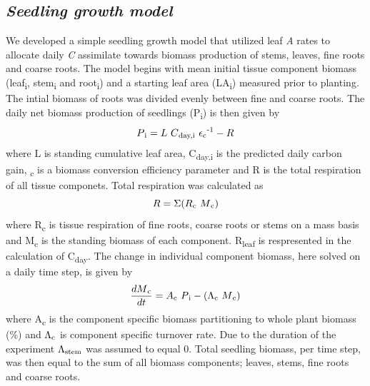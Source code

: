 \documentclass[a4paper]{article}\usepackage[]{graphicx}\usepackage[]{color}
\begin{document}
\subsection*{\textit{Seedling growth model}}
We developed a simple seedling growth model that utilized leaf \textit{A} rates to allocate daily \textit{C} assimilate towards biomass production of stems, leaves, fine roots and coarse roots. The model begins with mean initial tissue component biomass (leaf\textsubscript{i}, stem\textsubscript{i} and root\textsubscript{i}) and a starting leaf area (LA\textsubscript{i}) measured prior to planting. The intial biomass of roots was divided evenly between fine and coarse roots. The daily net biomass production of seedlings (P\textsubscript{i}) is then given by
\begin{equation} P\textsubscript{i}=L~C\textsubscript{day,i}~\epsilon\textsubscript{c}\textsuperscript{-1}-R
\label{eq:prod}
\end{equation}
where L is standing cumulative leaf area, C\textsubscript{day,i} is the predicted daily carbon gain, \textepsilon\textsubscript{c} is a biomass conversion efficiency parameter and R is the total respiration of all tissue componets. Total respiration was calculated as 
\begin{equation} R=\Sigma(R\textsubscript{c}~M\textsubscript{c})
\label{eq:resp}
\end{equation}
where R\textsubscript{c} is tissue respiration of fine roots, coarse roots or stems on a mass basis and M\textsubscript{c} is the standing biomass of each component. R\textsubscript{leaf} is respresented in the calculation of C\textsubscript{day}. The change in individual component biomass, here solved on a daily time step, is given by
\begin{equation} \frac{dM\textsubscript{c}}{dt}=A\textsubscript{c}~P\textsubscript{i}-(\Lambda\textsubscript{c}~M\textsubscript{c})
\label{eq:mass}
\end{equation}
where A\textsubscript{c} is the component specific biomass partitioning  to whole plant biomass (\%) and $\Lambda\textsubscript{c}$ is component specific turnover rate. Due to the duration of the experiment $\Lambda\textsubscript{stem}$ was assumed to equal 0.  Total seedling biomass, per time step, was then equal to the sum of all biomass components; leaves, stems, fine roots and coarse roots. 
\end{document}
